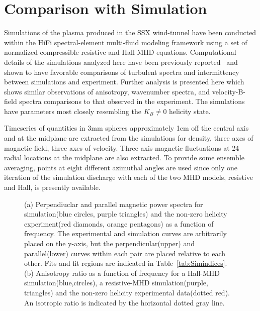 \documentclass[manuscript]{aastex}
\begin{document}
\section{Comparison with Simulation}\label{sec:simulation}

Simulations of the plasma produced in the SSX wind-tunnel have been conducted within the HiFi spectral-element multi-fluid modeling framework using a set of normalized compressible resistive and Hall-MHD equations. Computational details of the simulations analyzed here have been previously reported~\citep{sch14a} and shown to have favorable comparisons of turbulent spectra and intermittency between simulations and experiment. Further analysis is presented here which shows similar observations of anisotropy, wavenumber spectra, and velocity-B-field spectra comparisons to that observed in the experiment. The simulations have parameters most closely resembling the $K_{B}\neq 0$ helicity state. 

Timeseries of quantities in 3mm spheres approximately 1cm off the central axis and at the midplane are extracted from the simulations for density, three axes of magnetic field, three axes of velocity. Three axis magnetic fluctuations at 24 radial locations at the midplane are also extracted. To provide some ensemble averaging, points at eight different azimuthal angles are used since only one iteration of the simulation discharge with each of the two MHD models, resistive and Hall, is presently available.

\begin{figure}
\caption{\label{fig:aniso_comp} (a) Perpendiuclar and parallel magnetic power spectra for simulation(blue circles, purple triangles) and the non-zero helicity experiment(red diamonds, orange pentagons) as a function of frequency. The experimental and simulation curves are arbitrarily placed on the y-axis, but the perpendicular(upper) and parallel(lower) curves within each pair are placed relative to each other. Fits and fit regions are indicated in Table~\ref{tab:Simindices}. (b) Anisotropy ratio as a function of frequency for a Hall-MHD simulation(blue,circles), a resistive-MHD simulation(purple, triangles) and the non-zero helicity experimental data(dotted red). An isotropic ratio is indicated by the horizontal dotted gray line.}
\end{figure}
\end{document}
